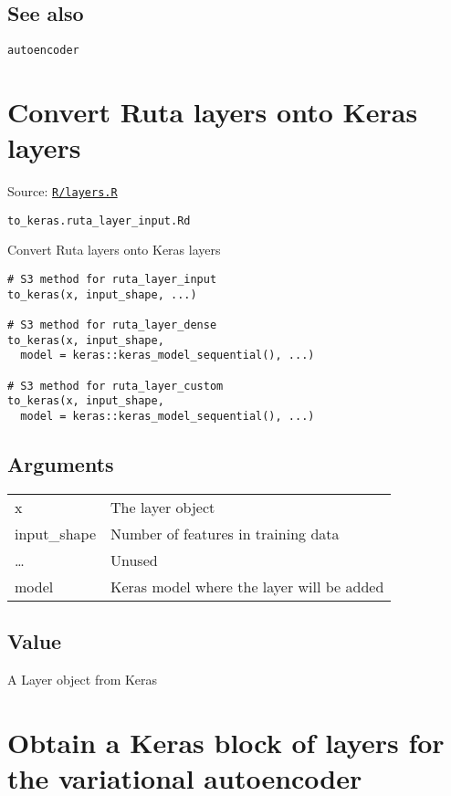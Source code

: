 \hypertarget{see-also}{\subsection{\texorpdfstring{\protect\hyperlink{see-also}{}See
also}{See also}}\label{see-also}}

\texttt{autoencoder}

\section{Convert Ruta layers onto Keras
layers}\label{convert-ruta-layers-onto-keras-layers}

Source:
\href{https://github.com/fdavidcl/ruta/blob/master/R/layers.R}{\texttt{R/layers.R}}

\texttt{to\_keras.ruta\_layer\_input.Rd}

Convert Ruta layers onto Keras layers

\begin{verbatim}
# S3 method for ruta_layer_input
to_keras(x, input_shape, ...)

# S3 method for ruta_layer_dense
to_keras(x, input_shape,
  model = keras::keras_model_sequential(), ...)

# S3 method for ruta_layer_custom
to_keras(x, input_shape,
  model = keras::keras_model_sequential(), ...)
\end{verbatim}

\hypertarget{arguments}{\subsection{\texorpdfstring{\protect\hyperlink{arguments}{}Arguments}{Arguments}}\label{arguments}}

\begin{longtable}[c]{@{}ll@{}}
\toprule
x & The layer object\tabularnewline
input\_shape & Number of features in training data\tabularnewline
\ldots{} & Unused\tabularnewline
model & Keras model where the layer will be added\tabularnewline
\bottomrule
\end{longtable}

\hypertarget{value}{\subsection{\texorpdfstring{\protect\hyperlink{value}{}Value}{Value}}\label{value}}

A Layer object from Keras

\section{Obtain a Keras block of layers for the variational
autoencoder}\label{obtain-a-keras-block-of-layers-for-the-variational-autoencoder}

